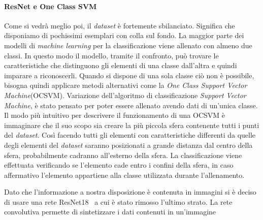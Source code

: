 \paragraph{ResNet e One Class SVM}
Come si vedrà meglio poi, il \textit{dataset} è fortemente sbilanciato.
Significa che disponiamo di pochissimi esemplari con colla sul fondo.
La maggior parte dei modelli di \textit{machine learning} per la classificazione viene allenato con almeno due classi.
In questo modo il modello, tramite il confronto, può trovare le caratteristiche che distinguono gli elementi di una classe dall'altra e quindi imparare a riconoscerli.
Quando si dispone di una sola classe ciò non è possibile, bisogna quindi applicare metodi alternativi come la \textit{One Class Support Vector Machine}(OCSVM).
Variazione dell'algoritmo di classificazione \textit{Support Vector Machine}, è stato pensato per poter essere allenato avendo dati di un'unica classe.
Il modo più intuitivo per descrivere il funzionamento di una OCSVM è immaginare che il suo scopo sia creare la più piccola sfera contenente tutti i punti del \textit{dataset}.
Così facendo tutti gli elementi con caratteristiche differenti da quelle degli elementi del \textit{dataset} saranno posizionati a grande distanza dal centro della sfera, probabilmente cadranno all'esterno della sfera.
La classificazione viene effettuata verificando se l'elemento cade entro i confini della sfera, in caso affermativo l'elemento appartiene alla classe utilizzata durante l'allenamento.

Dato che l'informazione a nostra disposizione è contenuta in immagini si è deciso di usare una rete ResNet18~\cite{resnet} a cui è stato rimosso l'ultimo strato.
La rete convolutiva permette di sintetizzare i dati contenuti in un'immagine 










